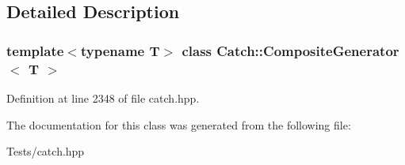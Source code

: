 \subsection{Detailed Description}
\subsubsection*{template$<$typename T$>$\newline
class Catch\+::\+Composite\+Generator$<$ T $>$}



Definition at line 2348 of file catch.\+hpp.



The documentation for this class was generated from the following file\+:\begin{DoxyCompactItemize}
\item 
Tests/catch.\+hpp\end{DoxyCompactItemize}
